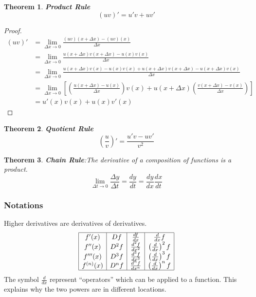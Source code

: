 \documentclass[10pt, a4paper]{article}
\newtheorem{theorem}{Theorem}
\begin{document}
\begin{theorem}
    \textbf{Product Rule}
    \[
        (uv)' = u'v + uv'
    \]
\end{theorem}

\begin{proof}
    \begin{align*}
        (uv)' &= \lim_{\Delta x\to0}\frac{(uv)(x+\Delta x)-(uv)(x)}{\Delta x}  \\
        &= \lim_{\Delta x\to0}\frac{u(x+\Delta x)v(x+\Delta x)-u(x)v(x)}{\Delta x} \\
        &= \lim\limits_{\Delta x\to0}\frac{u(x+\Delta x)v(x)-u(x)v(x)+u(x+\Delta x)v(x+\Delta x)-u(x+\Delta x)v(x)}{\Delta x} \\
        &= \lim\limits_{\Delta x\to0}\left[\left(\frac{u(x+\Delta x)-u(x)}{\Delta x}\right)v(x)+u(x+\Delta x)\left(\frac{v(x+\Delta x)-v(x)}{\Delta x}\right)\right] \\
        &=u'(x)v(x)+u(x)v'(x)
    \end{align*}
\end{proof}

\begin{theorem}
    \textbf{Quotient Rule}
    \[
        \left(\frac uv\right)'=\frac{u'v-uv'}{v^2}
    \]
\end{theorem}

\begin{theorem}
    \textbf{Chain Rule}:The derivative of a composition of functions is a product. 
    \[
        \lim_{\Delta t\to0}\frac{\Delta y}{\Delta t}=\frac{dy}{dt}=\frac{dy}{dx}\frac{dx}{dt}
    \]
\end{theorem}

\subsubsection*{Notations}
Higher derivatives are derivatives of derivatives.
\[
    \begin{array}{|c|c|c|c|}
        \hline
        f'(x) & Df & \frac{df}{dx} & \frac{d}{dx}f \\
        f''(x) & D^2 f & \frac{d^2f}{dx^2} & \left(\frac{d}{dx}\right)^2f \\
        f'''(x) & D^3 f & \frac{d^3f}{dx^3} & \left(\frac{d}{dx}\right)^3f \\
        f^{(n)}(x) & D^n f & \frac{d^nf}{dx^n} & \left(\frac{d}{dx}\right)^nf \\
        \hline
    \end{array}
\]
The symbol $\frac{d}{dx}$ represent “operators” which can be applied to a function. 
This explains why the two powers are in different locations.
\end{document}
